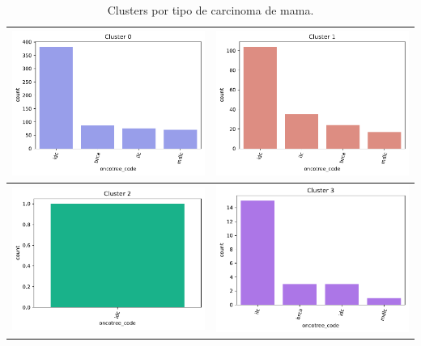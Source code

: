\begin{table}[!htb]
	\begin{center} 
		\begin{tabular}{ |c|c| }
			\hline 
		      \includegraphics[width=.5\textwidth]{NOTEBOOK/IMAGENES_BIRCH_CLUSTERING/1_Cluster_0_oncotree_code} 
			& \includegraphics[width=.5\textwidth]{NOTEBOOK/IMAGENES_BIRCH_CLUSTERING/1_Cluster_1_oncotree_code} 
			\\  \hline
			  \includegraphics[width=.5\textwidth]{NOTEBOOK/IMAGENES_BIRCH_CLUSTERING/1_Cluster_2_oncotree_code} 
			& \includegraphics[width=.5\textwidth]{NOTEBOOK/IMAGENES_BIRCH_CLUSTERING/1_Cluster_3_oncotree_code} 
			\\  \hline            
		\end{tabular} 
		\caption{Clusters por tipo de carcinoma de mama.}
		\label{carcinoma_cluster}
	\end{center} 
\end{table}

